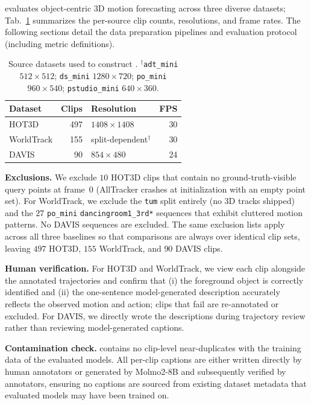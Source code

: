 \benchmarkname{} evaluates object-centric 3D motion forecasting across three
diverse datasets; Tab.~\ref{tab:appendix-3dworldbench-sources} summarizes the
per-source clip counts, resolutions, and frame rates. The following sections
detail the data preparation pipelines and evaluation protocol (including
metric definitions).

\begin{table}[h]
  \centering
  \small
  \setlength{\tabcolsep}{6pt}
  \begin{tabular}{lrlr}
    Dataset    & Clips & Resolution                & FPS \\
    \midrule
    HOT3D      & 497   & $1408\times1408$          & 30  \\
    WorldTrack & 155   & split-dependent$^\dagger$ & 30  \\
    DAVIS      & 90    & $854\times480$            & 24  \\
  \end{tabular}
  \vspace{2mm}
  \caption{Source datasets used to construct \benchmarkname{}.
    $^\dagger$\texttt{adt\_mini} $512\times512$; \texttt{ds\_mini} $1280\times720$;
    \texttt{po\_mini} $960\times540$; \texttt{pstudio\_mini} $640\times360$.}
  \label{tab:appendix-3dworldbench-sources}
\end{table}

\noindent\textbf{Exclusions.}
We exclude $10$ HOT3D clips that contain no ground-truth-visible query points at
frame~$0$ (AllTracker crashes at initialization with an empty point set).
For WorldTrack, we exclude the \texttt{tum} split entirely (no 3D tracks
shipped) and the $27$ \texttt{po\_mini} \texttt{dancingroom1\_3rd*}
sequences that exhibit cluttered motion patterns. No DAVIS sequences are
excluded. The same exclusion lists apply across all three baselines so that
comparisons are always over identical clip sets, leaving $497$ HOT3D, $155$
WorldTrack, and $90$ DAVIS clips.

\noindent\textbf{Human verification.}
For HOT3D and WorldTrack, we view each clip alongside the annotated
trajectories and confirm that (i) the foreground object is correctly
identified and (ii) the one-sentence model-generated description accurately reflects the
observed motion and action; clips that fail are re-annotated or excluded.
For DAVIS, we directly wrote the descriptions during trajectory review rather than reviewing model-generated captions.

\noindent\textbf{Contamination check.}
\benchmarkname{} contains no clip-level near-duplicates with the training
data of the evaluated models. All per-clip captions are either written directly by human
annotators or generated by Molmo2-8B and subsequently verified by annotators,
ensuring no captions are sourced from existing dataset metadata that evaluated models may have been trained on.

